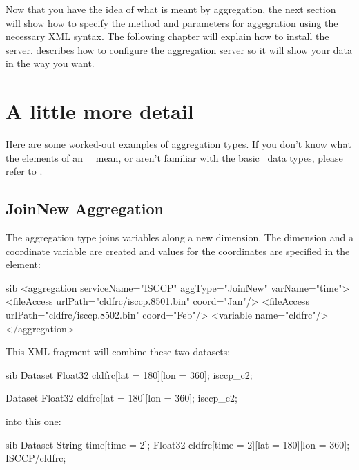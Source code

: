 \documentclass{dods-book}
\begin{document}
Now that you have the idea of what is meant by aggregation, the next
section will show how to specify the method and parameters for
aggegration using the necessary XML syntax.  The following chapter
will explain how to install the server.  
describes how to configure the aggregation server so it will show your
data in the way you want.


\section{A little more detail}

Here are some worked-out examples of aggregation types.  If you don't
know what the elements of an \opendap\ \dds\ mean, or aren't familiar
with the basic \opendap\ data types, please refer to \DODSuser .

\subsection{JoinNew Aggregation}
\label{agg,joinnew}


The  aggregation type joins variables along a new
dimension. The dimension and a coordinate variable are created and
values for the coordinates are specified in the 
element: 

\begin{vcode}{sib}
<aggregation serviceName="ISCCP" aggType="JoinNew" 
             varName="time">
  <fileAccess urlPath="cldfrc/isccp.8501.bin" coord="Jan"/>
  <fileAccess urlPath="cldfrc/isccp.8502.bin" coord="Feb"/>
  <variable name="cldfrc"/>
</aggregation>
\end{vcode}

This XML fragment will combine these two datasets:

\begin{vcode}{sib}
Dataset {
  Float32 cldfrc[lat = 180][lon = 360];
} isccp_c2;

Dataset {
  Float32 cldfrc[lat = 180][lon = 360];
} isccp_c2;
\end{vcode}

into this one:

\begin{vcode}{sib}
Dataset {
  String time[time = 2];
  Float32 cldfrc[time = 2][lat = 180][lon = 360];
} ISCCP/cldfrc;
\end{vcode}
\end{document}
